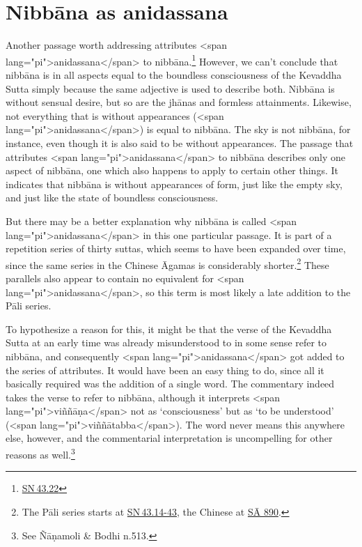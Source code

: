 \documentclass[10pt, openright]{book}
\begin{document}
\section{Nibbāna as anidassana}
Another passage worth addressing attributes <span lang="pi">anidassana</span> to nibbāna.\footnote {\href{https://suttacentral.net/sn43.22/en/sujato}{SN 43.22}} However, we can’t conclude that nibbāna is in all aspects equal to the boundless consciousness of the Kevaddha Sutta simply because the same adjective is used to describe both. Nibbāna is without sensual desire, but so are the jhānas and formless attainments. Likewise, not everything that is without appearances (<span lang="pi">anidassana</span>) is equal to nibbāna. The sky is not nibbāna, for instance, even though it is also said to be without appearances. The passage that attributes <span lang="pi">anidassana</span> to nibbāna describes only one aspect of nibbāna, one which also happens to apply to certain other things. It indicates that nibbāna is without appearances of form, just like the empty sky, and just like the state of boundless consciousness.


But there may be a better explanation why nibbāna is called <span lang="pi">anidassana</span> in this one particular passage. It is part of a repetition series of thirty suttas, which seems to have been expanded over time, since the same series in the Chinese Āgamas is considerably shorter.\footnote {The Pāli series starts at \href{https://suttacentral.net/sn43.14-43/en/sujato}{SN 43.14-43}, the Chinese at \href{https://suttacentral.net/Sa890}{SĀ 890}.} These parallels also appear to contain no equivalent for <span lang="pi">anidassana</span>, so this term is most likely a late addition to the Pāli series.


To hypothesize a reason for this, it might be that the verse of the Kevaddha Sutta at an early time was already misunderstood to in some sense refer to nibbāna, and consequently <span lang="pi">anidassana</span> got added to the series of attributes. It would have been an easy thing to do, since all it basically required was the addition of a single word. The commentary indeed takes the verse to refer to nibbāna, although it interprets <span lang="pi">viññāṇa</span> not as ‘consciousness’ but as ‘to be understood’ (<span lang="pi">viññātabba</span>). The word never means this anywhere else, however, and the commentarial interpretation is uncompelling for other reasons as well.\footnote {See Ñāṇamoli \& Bodhi n.513.}
\end{document}

